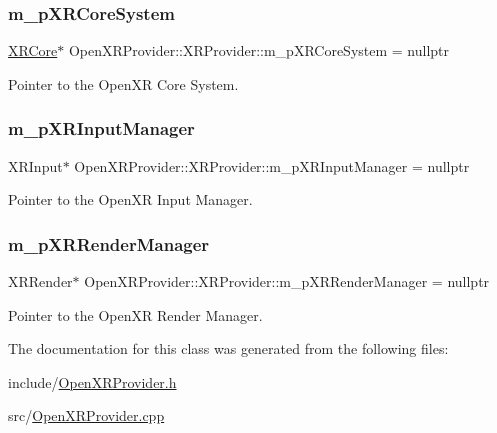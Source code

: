 \subsubsection{\texorpdfstring{m\_pXRCoreSystem}{m\_pXRCoreSystem}}
{\footnotesize\ttfamily \mbox{\hyperlink{class_open_x_r_provider_1_1_x_r_core}{X\+R\+Core}}$\ast$ Open\+X\+R\+Provider\+::\+X\+R\+Provider\+::m\+\_\+p\+X\+R\+Core\+System = nullptr\hspace{0.3cm}{\ttfamily [private]}}



Pointer to the Open\+XR Core System. 

\mbox{\label{class_open_x_r_provider_1_1_x_r_provider_a9fef42bd0f6dd1b68e3db499bb10eb37}} 
\subsubsection{\texorpdfstring{m\_pXRInputManager}{m\_pXRInputManager}}
{\footnotesize\ttfamily X\+R\+Input$\ast$ Open\+X\+R\+Provider\+::\+X\+R\+Provider\+::m\+\_\+p\+X\+R\+Input\+Manager = nullptr\hspace{0.3cm}{\ttfamily [private]}}



Pointer to the Open\+XR Input Manager. 

\mbox{\label{class_open_x_r_provider_1_1_x_r_provider_a3c37e01f29d070361c29efc4b5b49370}} 
\subsubsection{\texorpdfstring{m\_pXRRenderManager}{m\_pXRRenderManager}}
{\footnotesize\ttfamily X\+R\+Render$\ast$ Open\+X\+R\+Provider\+::\+X\+R\+Provider\+::m\+\_\+p\+X\+R\+Render\+Manager = nullptr\hspace{0.3cm}{\ttfamily [private]}}



Pointer to the Open\+XR Render Manager. 



The documentation for this class was generated from the following files\+:\begin{DoxyCompactItemize}
\item 
include/\mbox{\hyperlink{_open_x_r_provider_8h}{Open\+X\+R\+Provider.\+h}}\item 
src/\mbox{\hyperlink{_open_x_r_provider_8cpp}{Open\+X\+R\+Provider.\+cpp}}\end{DoxyCompactItemize}
